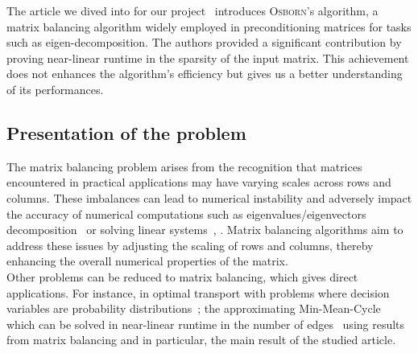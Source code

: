 The article we dived into for our project~\cite{altschuler2023near} introduces \textsc{Osborn}'s algorithm, a matrix balancing algorithm widely employed in preconditioning matrices for tasks such as eigen-decomposition. The authors provided a significant contribution by proving near-linear runtime in the sparsity of the input matrix. This achievement does not enhances the algorithm's efficiency but gives us a better understanding of its performances.

\subsection{Presentation of the problem}

The matrix balancing problem arises from the recognition that matrices encountered in practical applications may have varying scales across rows and columns. These imbalances can lead to numerical instability and adversely impact the accuracy of numerical computations such as eigenvalues/eigenvectors decomposition~\cite{chen2000balancing, chen2001preconditioning} or solving linear systems~\cite{chen2001preconditioning}, . Matrix balancing algorithms aim to address these issues by adjusting the scaling of rows and columns, thereby enhancing the overall numerical properties of the matrix.\\

Other problems can be reduced to matrix balancing, which gives direct applications. For instance, in optimal transport with problems where decision variables are probability distributions~\cite{altschuler2022transport}; the approximating Min-Mean-Cycle which can be solved in near-linear runtime in the number of edges~\cite{altschuler2022approximating} using results from matrix balancing and in particular, the main result of the studied article. 



